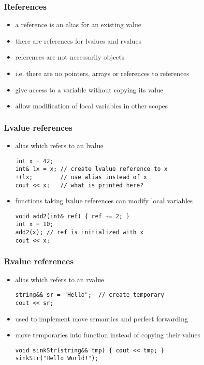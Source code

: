 \begin{frame}[fragile]
    \frametitle{References}
    \begin{itemize}
        \item a reference is an alias for an existing value
        \item there are references for lvalues and rvalues
        \item references are not necessarily objects
        \item i.e. there are no pointers, arrays or references to references
        \item give access to a variable without copying its value
        \item allow modification of local variables in other scopes
    \end{itemize}
\end{frame}

\begin{frame}[fragile]
    \frametitle{Lvalue references}
    \begin{itemize}
        \item alias which refers to an lvalue
        \begin{lstlisting}
int x = 42;
int& lx = x; // create lvalue reference to x
++lx;        // use alias instead of x
cout << x;   // what is printed here?
        \end{lstlisting}
        \item functions taking lvalue references can modify local variables
        \begin{lstlisting}
void add2(int& ref) { ref += 2; }
int x = 10;
add2(x); // ref is initialized with x
cout << x;
        \end{lstlisting}
    \end{itemize}
\end{frame}

\begin{frame}[fragile]
    \frametitle{Rvalue references}
    \begin{itemize}
        \item alias which refers to an rvalue
        \begin{lstlisting}
string&& sr = "Hello";  // create temporary
cout << sr;
        \end{lstlisting}
        \item used to implement move semantics and perfect forwarding
        \item move temporaries into function instead of copying their values
        \begin{lstlisting}
void sinkStr(string&& tmp) { cout << tmp; }
sinkStr("Hello World!");
        \end{lstlisting}
    \end{itemize}
\end{frame}


